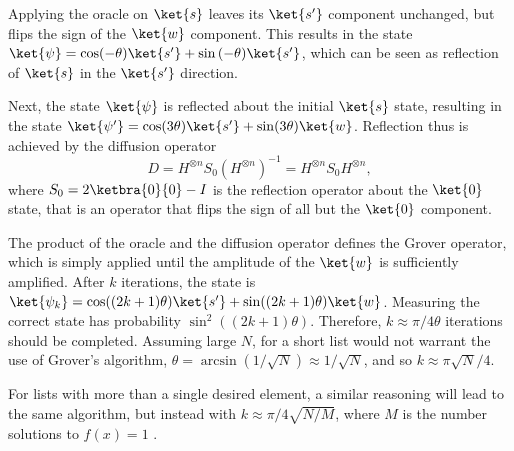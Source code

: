 Applying the oracle on $\ket{s}$ leaves its $\ket{s'}$ component unchanged, but flips the sign of the $\ket{w}$ component.
This results in the state $\ket{\psi} = \cos(-\theta)\ket{s'} + \sin{(-\theta)}\ket{s'}$, which can be seen as reflection of $\ket{s}$ in the $\ket{s'}$ direction.


Next, the state $\ket{\psi}$ is reflected about the initial $\ket{s}$ state, resulting in the state $\ket{\psi'} = \cos(3\theta)\ket{s'} + \sin(3\theta)\ket{w}$.
Reflection thus is achieved by the diffusion operator
\begin{equation}
    D=H^{\otimes n} S_0 (H^{\otimes n})^{-1} = H^{\otimes n} S_0 H^{\otimes n},
\end{equation}
where $S_0= 2\ketbra{0}{0} - I$ is the reflection operator about the $\ket{0}$ state, that is an operator that flips the sign of all but the $\ket{0}$ component.

The product of the oracle and the diffusion operator defines the Grover operator, which is simply applied until the amplitude of the  $\ket{w}$ is sufficiently amplified.
After $k$ iterations, the state is $\ket{\psi_k} = \cos((2k+1)\theta)\ket{s'} + \sin((2k+1)\theta)\ket{w}$.
Measuring the correct state has probability $\sin^2((2k+1)\theta)$.
Therefore, $k \approx {\pi}/{4\theta}$ iterations should be completed.
Assuming large $N$, for a short list would not warrant the use of Grover's algorithm, $\theta = \arcsin{({1}/{\sqrt{N}})} \approx 1/\sqrt{N}$, and so $k \approx \pi\sqrt{N}/4$.

For lists with more than a single desired element, a similar reasoning will lead to the same algorithm, but instead with $k\approx\pi/4\sqrt{N/M}$, where $M$ is the number solutions to $f(x)=1$ \cite{nielsen2012}.


